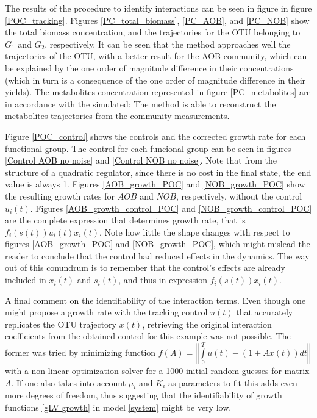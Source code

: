 \documentclass[processes,article,submit,moreauthors,pdftex]{Definitions/mdpi}
\begin{document}
The results of the procedure to identify interactions can be seen in figure in figure \ref{POC_tracking}. Figures \ref{PC_total_biomass}, \ref{PC_AOB}, and \ref{PC_NOB} show the total biomass concentration, and the trajectories for the OTU belonging to $G_1$ and $G_2$, respectively. It can be seen that the method approaches well the trajectories of the OTU, with a better result for the AOB community, which can be explained by the one order of magnitude difference in their concentrations (which in turn is a consequence of the one order of magnitude difference in their yields). The metabolites concentration represented in figure \ref{PC_metabolites} are in accordance with the simulated: The method is able to reconstruct the metabolites trajectories from the community measurements. 

Figure \ref{POC_control} shows the controls and the corrected growth rate for each functional group. The control for each funcional group can be seen in figures \ref{Control AOB no noise} and \eqref{Control NOB no noise}. Note that from the structure of a quadratic regulator, since there is no cost in the final state, the end value is always 1. Figures \ref{AOB_growth_POC} and  \ref{NOB_growth_POC} show the resulting growth rates for $AOB$ and $NOB$, respectively, without the control $u_i(t)$. Figures  \ref{AOB_growth_control_POC} and \ref{NOB_growth_control_POC} are the complete expression that determines growth rate, that is  $f_i(s(t))u_i(t)x_i(t)$. Note how little the shape changes with respect to figures \ref{AOB_growth_POC} and \ref{NOB_growth_POC}, which might mislead the reader to conclude that the control had reduced effects in the dynamics. The way out of this conundrum is to remember that the control's effects are already included in $x_i(t)$ and $s_i(t)$, and thus in expression $f_i(s(t))x_i(t)$. 

A final comment on the identifiability of the interaction terms. Even though one might propose a growth rate with the tracking control $u(t)$ that accurately replicates the OTU trajectory $x(t)$, retrieving the original interaction coefficients from the obtained control for this example was not possible. The former was tried by minimizing function $\displaystyle f(A) = \left \Vert \int \limits_{0}^Tu(t)-(1+Ax(t)) dt \right\Vert $ with a non linear optimization solver for a 1000 initial random guesses for matrix $A$. If one also takes into account $\bar{\mu}_i$ and $K_i$ as parameters to fit this adds even more degrees of freedom, thus suggesting that the identifiability of growth functions \eqref{gLV growth} in model \eqref{system} might be very low.
\end{document}
